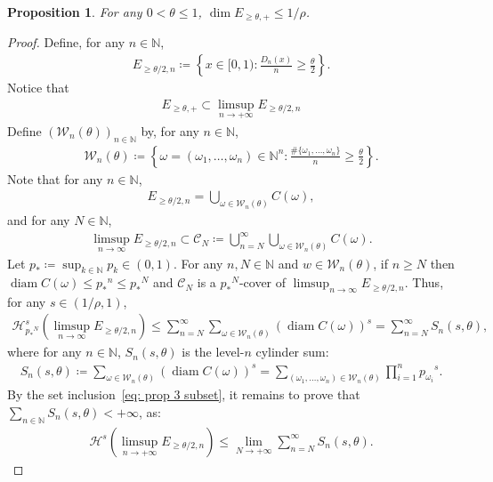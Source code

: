 \documentclass[12pt,reqno]{amsart}
\theoremstyle{definition}
\theoremstyle{plain}
\newtheorem{prop}{Proposition}
\begin{document}
\begin{prop}\label{prop: thm 1 prop 4}
    For any $0<\theta\leq 1$, $\dim{E_{\geq\theta,+}}\leq 1/\rho$.
\end{prop}
\begin{proof}
Define, for any $n\in\mathbb{N}$,
\begin{align*}
    E_{\geq\theta/2,n} \coloneqq \left\{x\in[0,1): \frac{D_n(x)}{n}\geq\frac{\theta}{2}\right\}.
\end{align*}
Notice that
\begin{align}
    \label{eq: prop 3 subset}
    E_{\geq\theta,+}\subset\limsup_{n\to+\infty}E_{\geq\theta/2,n}
\end{align}
Define $(\mathcal{W}_n(\theta))_{n\in\mathbb{N}}$ by, for any $n\in\mathbb{N}$,
\begin{align*}
    \mathcal{W}_n(\theta)
    \coloneqq\left\{\omega=(\omega_1,\ldots,\omega_n)\in\mathbb{N}^n:\frac{\#\{\omega_1,\ldots,\omega_n\}}{n}\geq\frac{\theta}{2}\right\}.
\end{align*}
Note that for any $n\in\mathbb{N}$,
\begin{align*}
    E_{\geq \theta/2,n}
    =\bigcup_{\omega\in\mathcal{W}_n(\theta)} C(\omega),
\end{align*}
and for any $N\in\mathbb{N}$,
\begin{align*}
    \limsup_{n\to\infty}E_{\geq \theta/2,n}
    \subset
    \mathcal{C}_N\coloneqq\bigcup_{n=N}^\infty \bigcup_{\omega\in\mathcal{W}_n(\theta)} C(\omega).
\end{align*}
Let $p_*\coloneqq\sup_{k\in\mathbb{N}}p_k\in(0,1)$. For any $n,N\in\mathbb{N}$ and $w\in\mathcal{W}_n(\theta)$, if $n\geq{N}$ then $\operatorname{diam}C(\omega)\leq {p_*}^n\leq {p_*}^N$ and $\mathcal{C}_N$ is a ${p_*}^N$-cover of $\limsup_{n\to\infty}E_{\geq \theta/2,n}$.
Thus, for any $s\in(1/\rho,1)$,
\begin{align*}
    \mathcal{H}^s_{{p_*}^N}{\left(\limsup_{n\to\infty}E_{\geq \theta/2,n}\right)}
    \leq
    \sum_{n=N}^\infty\sum_{\omega\in\mathcal W_n(\theta)}(\operatorname{diam}{C(\omega)})^s
    =
    \sum_{n=N}^\infty S_n(s,\theta),
\end{align*}
where for any $n\in\mathbb{N}$, $S_n(s,\theta)$ is the level-$n$ cylinder sum: 
\begin{align*}
    S_n(s,\theta)
    \coloneqq \sum_{\omega\in\mathcal{W}_n(\theta)} (\operatorname{diam}{C(\omega)})^s
    =\sum_{(\omega_1,\ldots,\omega_n)\in\mathcal{W}_n(\theta)}
    \prod_{i=1}^n {p_{\omega_i}}^{s}.
\end{align*}
By the set inclusion~\eqref{eq: prop 3 subset}, it remains to prove that $\sum_{n\in\mathbb{N}} S_n(s,\theta)<+\infty$, as:
\begin{align}
    \label{eq:HsEn}
    \mathcal{H}^s\left(\limsup_{n\to+\infty}E_{\geq\theta/2,n}\right)
    \leq \lim_{N\to+\infty}\sum_{n=N}^{\infty}S_n(s,\theta).
\end{align}


\end{proof}
\end{document}
